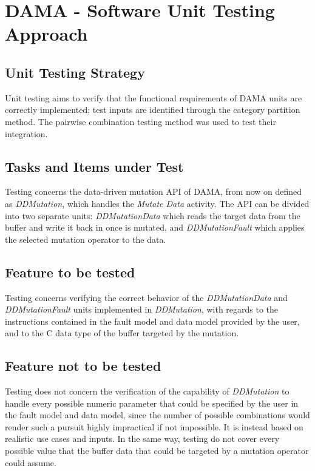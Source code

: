 
\chapter{DAMA - Software Unit Testing Approach}
\label{chap:approach_DAMA}


\section{Unit Testing Strategy}

Unit testing aims to verify that the functional requirements of DAMA units are correctly implemented; test inputs are identified through the category partition method.
The pairwise combination testing method was used to test their integration.


\section{Tasks and Items under Test}

Testing concerns the data-driven mutation API of DAMA, from now on defined as \emph{DDMutation}, which handles the \emph{Mutate Data} activity.
The API can be divided into two separate units: \emph{DDMutationData} which reads the target data from the buffer and write it back in once is mutated, and \emph{DDMutationFault} which applies the selected mutation operator to the data.

\section{Feature to be tested}

Testing concerns verifying the correct behavior of the \emph{DDMutationData} and \emph{DDMutationFault} units implemented in \emph{DDMutation}, with regards to the instructions contained in the fault model and data model provided by the user, and to the C data type of the buffer targeted by the mutation.

\section{Feature not to be tested}

Testing does not concern the verification of the capability of \emph{DDMutation} to handle every possible numeric parameter that could be specified by the user in the fault model and data model, since the number of possible combinations would render such a pursuit highly impractical if not impossible.
It is instead based on realistic use cases and inputs.
In the same way, testing do not cover every possible value that the buffer data that could be targeted by a mutation operator could assume.


